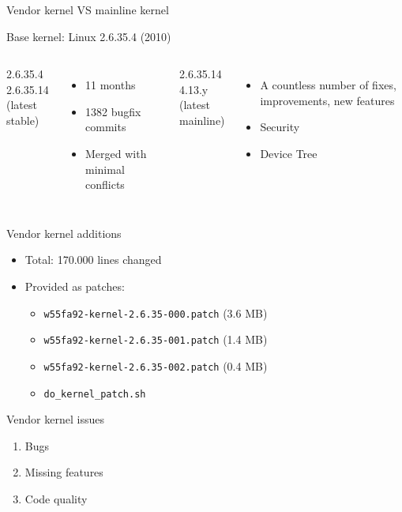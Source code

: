 \documentclass[xetex,table]{beamer}
\begin{document}
\begin{frame}{Vendor kernel VS mainline kernel}
  \begin{center}
  Base kernel: Linux 2.6.35.4 (2010)
  \end{center}

  \vspace{0.1\textheight}

  \begin{columns}
    2.6.35.4 \textrightarrow{} 2.6.35.14\\
    (latest stable)
    \begin{itemize}
    \item 11 months
    \item 1382 bugfix commits
    \item Merged with minimal conflicts
    \end{itemize}

    2.6.35.14 \textrightarrow{} 4.13.y\\
    (latest mainline)
    \begin{itemize}
    \item A countless number of fixes, improvements, new features
    \item Security
    \item Device Tree
    \end{itemize}
  \end{columns}
\end{frame}

\begin{frame}{Vendor kernel additions}
  \begin{itemize}
  \item Total: 170.000 lines changed
  \item Provided as patches:
    \begin{itemize}
    \item \texttt{w55fa92-kernel-2.6.35-000.patch} (3.6 MB)
    \item \texttt{w55fa92-kernel-2.6.35-001.patch} (1.4 MB)
    \item \texttt{w55fa92-kernel-2.6.35-002.patch} (0.4 MB)
    \item \texttt{do\_kernel\_patch.sh}
    \end{itemize}
  \end{itemize}
\end{frame}

\begin{frame}{Vendor kernel issues}
  \begin{enumerate}
  \item Bugs
  \item Missing features
  \item Code quality
  \end{enumerate}
\end{frame}
\end{document}
